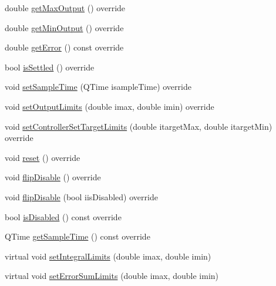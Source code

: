 \begin{DoxyCompactItemize}
\item 
double \mbox{\hyperlink{classokapi_1_1IterativePosPIDController_a71538d55cd0a98812a749af84f8ec7aa}{get\+Max\+Output}} () override
\item 
double \mbox{\hyperlink{classokapi_1_1IterativePosPIDController_a51666c20236a2a9ff87e843cf746833e}{get\+Min\+Output}} () override
\item 
double \mbox{\hyperlink{classokapi_1_1IterativePosPIDController_a632611340113011f75c7ee1c389231e3}{get\+Error}} () const override
\item 
bool \mbox{\hyperlink{classokapi_1_1IterativePosPIDController_a856b633717128607fa8f1b52d91f89d6}{is\+Settled}} () override
\item 
void \mbox{\hyperlink{classokapi_1_1IterativePosPIDController_a89e9f71510b9779282175fe3f5b071d6}{set\+Sample\+Time}} (Q\+Time isample\+Time) override
\item 
void \mbox{\hyperlink{classokapi_1_1IterativePosPIDController_a64c3fddb91ceaac4e747404afc5295ae}{set\+Output\+Limits}} (double imax, double imin) override
\item 
void \mbox{\hyperlink{classokapi_1_1IterativePosPIDController_a556937096c9a1331e705a8fa9175c884}{set\+Controller\+Set\+Target\+Limits}} (double itarget\+Max, double itarget\+Min) override
\item 
void \mbox{\hyperlink{classokapi_1_1IterativePosPIDController_a038da11f8e6e16139423e2284afa797c}{reset}} () override
\item 
void \mbox{\hyperlink{classokapi_1_1IterativePosPIDController_a8f7e1c7bc45f6b9df7a24edb60fc9e6a}{flip\+Disable}} () override
\item 
void \mbox{\hyperlink{classokapi_1_1IterativePosPIDController_a5b0755a4839a25af4c5fa7f4e03398ca}{flip\+Disable}} (bool iis\+Disabled) override
\item 
bool \mbox{\hyperlink{classokapi_1_1IterativePosPIDController_a8800531c198ae47c0e7b602db2dd10d3}{is\+Disabled}} () const override
\item 
Q\+Time \mbox{\hyperlink{classokapi_1_1IterativePosPIDController_a12d70574d5234d2928d77114e0c90df9}{get\+Sample\+Time}} () const override
\item 
virtual void \mbox{\hyperlink{classokapi_1_1IterativePosPIDController_a65dd3f1eb00a526ec191d80ec282f4ae}{set\+Integral\+Limits}} (double imax, double imin)
\item 
virtual void \mbox{\hyperlink{classokapi_1_1IterativePosPIDController_a76fc3c387e87ff2c6e08c54b8670eeb4}{set\+Error\+Sum\+Limits}} (double imax, double imin)

\end{DoxyCompactItemize}
